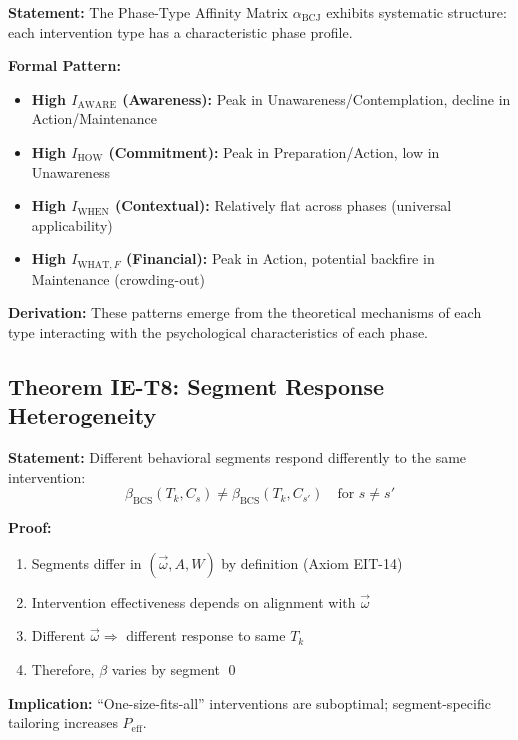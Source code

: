 \begin{tcolorbox}[colback=green!5!white, colframe=green!75!black,
    title=\textbf{Theorem IE-T7: Phase-Affinity Structure}]

\textbf{Statement:} The Phase-Type Affinity Matrix $\alpha_{\text{BCJ}}$ exhibits systematic structure: each intervention type has a characteristic phase profile.

\textbf{Formal Pattern:}
\begin{itemize}[nosep]
    \item \textbf{High $I_{\text{AWARE}}$ (Awareness):} Peak in Unawareness/Contemplation, decline in Action/Maintenance
    \item \textbf{High $I_{\text{HOW}}$ (Commitment):} Peak in Preparation/Action, low in Unawareness
    \item \textbf{High $I_{\text{WHEN}}$ (Contextual):} Relatively flat across phases (universal applicability)
    \item \textbf{High $I_{\text{WHAT},F}$ (Financial):} Peak in Action, potential backfire in Maintenance (crowding-out)
\end{itemize}

\textbf{Derivation:} These patterns emerge from the theoretical mechanisms of each type interacting with the psychological characteristics of each phase.

\end{tcolorbox}

\subsection{Theorem IE-T8: Segment Response Heterogeneity}

\begin{tcolorbox}[colback=green!5!white, colframe=green!75!black,
    title=\textbf{Theorem IE-T8: Segment Response Heterogeneity}]

\textbf{Statement:} Different behavioral segments respond differently to the same intervention:
\begin{equation}
\beta_{\text{BCS}}(T_k, C_s) \neq \beta_{\text{BCS}}(T_k, C_{s'}) \quad \text{for } s \neq s'
\end{equation}

\textbf{Proof:}
\begin{enumerate}[nosep]
    \item Segments differ in $(\vec{\omega}, A, W)$ by definition (Axiom EIT-14)
    \item Intervention effectiveness depends on alignment with $\vec{\omega}$
    \item Different $\vec{\omega} \Rightarrow$ different response to same $T_k$
    \item Therefore, $\beta$ varies by segment \qed
\end{enumerate}

\textbf{Implication:} ``One-size-fits-all'' interventions are suboptimal; segment-specific tailoring increases $P_{\text{eff}}$.

\end{tcolorbox}

